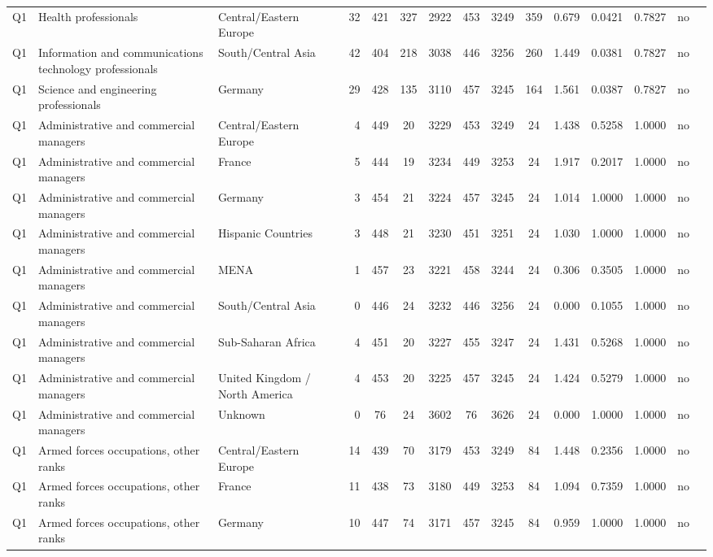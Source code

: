 \begin{longtable}{lllrcccccccccll}
Q1 & Health professionals & Central/Eastern Europe & 32 & 421 & 327 & 2922 & 453 & 3249 & 359 & 0.679 & 0.0421 & 0.7827 & no \\
Q1 & Information and communications technology professionals & South/Central Asia & 42 & 404 & 218 & 3038 & 446 & 3256 & 260 & 1.449 & 0.0381 & 0.7827 & no \\
Q1 & Science and engineering professionals & Germany & 29 & 428 & 135 & 3110 & 457 & 3245 & 164 & 1.561 & 0.0387 & 0.7827 & no \\
Q1 & Administrative and commercial managers & Central/Eastern Europe & 4 & 449 & 20 & 3229 & 453 & 3249 & 24 & 1.438 & 0.5258 & 1.0000 & no \\
Q1 & Administrative and commercial managers & France & 5 & 444 & 19 & 3234 & 449 & 3253 & 24 & 1.917 & 0.2017 & 1.0000 & no \\
Q1 & Administrative and commercial managers & Germany & 3 & 454 & 21 & 3224 & 457 & 3245 & 24 & 1.014 & 1.0000 & 1.0000 & no \\
Q1 & Administrative and commercial managers & Hispanic Countries & 3 & 448 & 21 & 3230 & 451 & 3251 & 24 & 1.030 & 1.0000 & 1.0000 & no \\
Q1 & Administrative and commercial managers & MENA & 1 & 457 & 23 & 3221 & 458 & 3244 & 24 & 0.306 & 0.3505 & 1.0000 & no \\
Q1 & Administrative and commercial managers & South/Central Asia & 0 & 446 & 24 & 3232 & 446 & 3256 & 24 & 0.000 & 0.1055 & 1.0000 & no \\
Q1 & Administrative and commercial managers & Sub-Saharan Africa & 4 & 451 & 20 & 3227 & 455 & 3247 & 24 & 1.431 & 0.5268 & 1.0000 & no \\
Q1 & Administrative and commercial managers & United Kingdom / North America & 4 & 453 & 20 & 3225 & 457 & 3245 & 24 & 1.424 & 0.5279 & 1.0000 & no \\
Q1 & Administrative and commercial managers & Unknown & 0 & 76 & 24 & 3602 & 76 & 3626 & 24 & 0.000 & 1.0000 & 1.0000 & no \\
Q1 & Armed forces occupations, other ranks & Central/Eastern Europe & 14 & 439 & 70 & 3179 & 453 & 3249 & 84 & 1.448 & 0.2356 & 1.0000 & no \\
Q1 & Armed forces occupations, other ranks & France & 11 & 438 & 73 & 3180 & 449 & 3253 & 84 & 1.094 & 0.7359 & 1.0000 & no \\
Q1 & Armed forces occupations, other ranks & Germany & 10 & 447 & 74 & 3171 & 457 & 3245 & 84 & 0.959 & 1.0000 & 1.0000 & no \\

\end{longtable}
